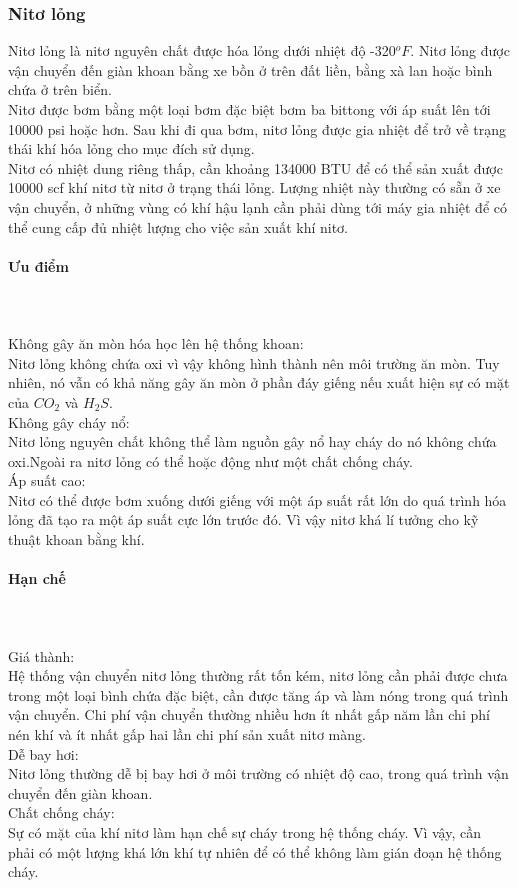 \documentclass[12pt,a4paper]{article}
\newcommand{\subsubsubsection}[1]{\paragraph{#1}\mbox{}\\}
\begin{document}
\subsubsection{Nitơ lỏng}
	Nitơ lỏng\cite{rehm2013underbalanced} là nitơ nguyên chất được hóa lỏng dưới nhiệt độ -320$^oF$. Nitơ lỏng được vận chuyển đến giàn khoan bằng xe bồn ở trên đất liền, bằng xà lan hoặc bình chứa ở trên biển.\\
	Nitơ được bơm bằng một loại bơm đặc biệt bơm ba bittong với áp suất lên tới 10000 psi hoặc hơn. Sau khi đi qua bơm, nitơ lỏng được gia nhiệt để trở về trạng thái khí hóa lỏng cho mục đích sử dụng.\\
	Nitơ có nhiệt dung riêng thấp, cần khoảng 134000 BTU để có thể sản xuất được 10000 scf khí nitơ từ nitơ ở trạng thái lỏng. Lượng nhiệt này thường có sẵn ở xe vận chuyển, ở những vùng có khí hậu lạnh cần phải dùng tới máy gia nhiệt để có thể cung cấp đủ nhiệt lượng cho việc sản xuất khí nitơ.
	\subsubsubsection{Ưu điểm}\\
	Không gây ăn mòn hóa học lên hệ thống khoan: \\
	Nitơ lỏng không chứa oxi vì vậy không hình thành nên môi trường ăn mòn. Tuy nhiên, nó vẫn có khả năng gây ăn mòn ở phần đáy giếng nếu xuất hiện sự có mặt của $CO_2$ và $H_2S$.\\
	Không gây cháy nổ:\\
	Nitơ lỏng nguyên chất không thể làm nguồn gây nổ hay cháy do nó không chứa oxi.Ngoài ra nitơ lỏng có thể hoặc động như một chất chống cháy.\\
	Áp suất cao:\\
	Nitơ có thể được bơm xuống dưới giếng với một áp suất rất lớn do quá trình hóa lỏng đã tạo ra một áp suất cực lớn trước đó. Vì vậy nitơ khá lí tưởng cho kỹ thuật khoan bằng khí.
	\subsubsubsection{Hạn chế}\\
	Giá thành:\\
	Hệ thống vận chuyển nitơ lỏng thường rất tốn kém, nitơ lỏng cần phải được chưa trong một loại bình chứa đặc biệt, cần được tăng áp và làm nóng trong quá trình vận chuyển. Chi phí vận chuyển thường nhiều hơn ít nhất gấp năm lần chi phí nén khí và ít nhất gấp hai lần chi phí sản xuất nitơ màng.\\
	Dễ bay hơi:\\
	Nitơ lỏng thường dễ bị bay hơi ở môi trường có nhiệt độ cao, trong quá trình vận chuyển đến giàn khoan.\\
	Chất chống cháy:\\
	Sự có mặt của khí nitơ làm hạn chế sự cháy trong hệ thống cháy. Vì vậy, cần phải có một lượng khá lớn khí tự nhiên để có thể không làm gián đoạn hệ thống cháy.
\end{document}
